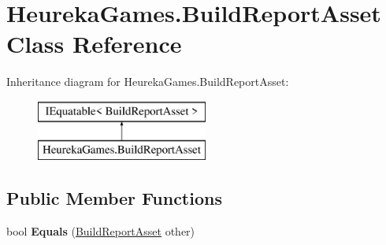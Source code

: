 \hypertarget{class_heureka_games_1_1_build_report_asset}{}\section{Heureka\+Games.\+Build\+Report\+Asset Class Reference}
\label{class_heureka_games_1_1_build_report_asset}
Inheritance diagram for Heureka\+Games.\+Build\+Report\+Asset\+:\begin{figure}[H]
\begin{center}
\leavevmode
\includegraphics[height=2.000000cm]{class_heureka_games_1_1_build_report_asset}
\end{center}
\end{figure}
\subsection*{Public Member Functions}
\begin{DoxyCompactItemize}
\item 
\mbox{\label{class_heureka_games_1_1_build_report_asset_ab0c5e53ddd3c9a00d6c3967b703c1b81}} 
bool {\bfseries Equals} (\hyperlink{class_heureka_games_1_1_build_report_asset}{Build\+Report\+Asset} other)
\end{DoxyCompactItemize}
